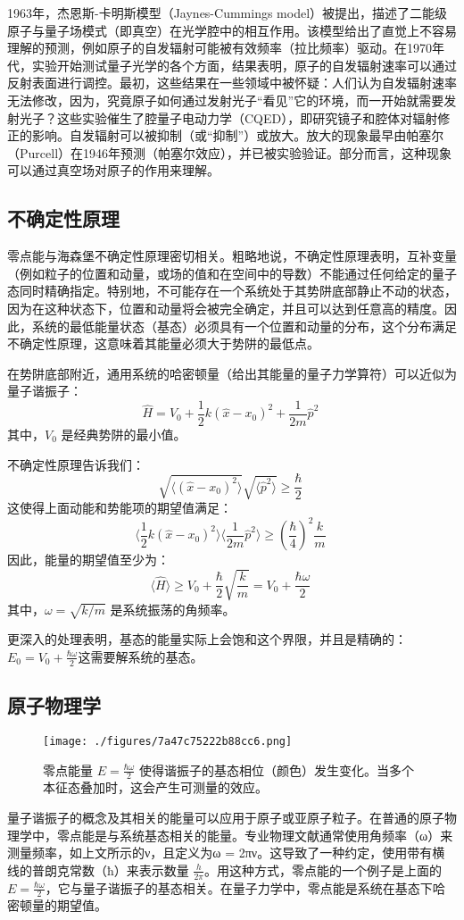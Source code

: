 1963年，杰恩斯-卡明斯模型（Jaynes-Cummings model）被提出，描述了二能级原子与量子场模式（即真空）在光学腔中的相互作用。该模型给出了直觉上不容易理解的预测，例如原子的自发辐射可能被有效频率（拉比频率）驱动。在1970年代，实验开始测试量子光学的各个方面，结果表明，原子的自发辐射速率可以通过反射表面进行调控。最初，这些结果在一些领域中被怀疑：人们认为自发辐射速率无法修改，因为，究竟原子如何通过发射光子“看见”它的环境，而一开始就需要发射光子？这些实验催生了腔量子电动力学（CQED），即研究镜子和腔体对辐射修正的影响。自发辐射可以被抑制（或“抑制”）或放大。放大的现象最早由帕塞尔（Purcell）在1946年预测（帕塞尔效应），并已被实验验证。部分而言，这种现象可以通过真空场对原子的作用来理解。
\subsection{不确定性原理}
零点能与海森堡不确定性原理密切相关。粗略地说，不确定性原理表明，互补变量（例如粒子的位置和动量，或场的值和在空间中的导数）不能通过任何给定的量子态同时精确指定。特别地，不可能存在一个系统处于其势阱底部静止不动的状态，因为在这种状态下，位置和动量将会被完全确定，并且可以达到任意高的精度。因此，系统的最低能量状态（基态）必须具有一个位置和动量的分布，这个分布满足不确定性原理，这意味着其能量必须大于势阱的最低点。

在势阱底部附近，通用系统的哈密顿量（给出其能量的量子力学算符）可以近似为量子谐振子：
\[
{\hat {H}} = V_0 + \frac{1}{2}k\left({\hat {x}} - x_0\right)^2 + \frac{1}{2m}{\hat {p}}^2~
\]
其中，\(V_0\) 是经典势阱的最小值。

不确定性原理告诉我们：
\[
\sqrt{\langle \left({\hat {x}} - x_0\right)^2 \rangle} \sqrt{\langle {\hat {p}}^2 \rangle} \geq \frac{\hbar}{2}~
\]
这使得上面动能和势能项的期望值满足：
\[
\langle \frac{1}{2}k\left({\hat {x}} - x_0\right)^2 \rangle \langle \frac{1}{2m}{\hat {p}}^2 \rangle \geq \left( \frac{\hbar}{4} \right)^2 \frac{k}{m}~
\]
因此，能量的期望值至少为：
\[
\langle {\hat {H}} \rangle \geq V_0 + \frac{\hbar}{2} \sqrt{\frac{k}{m}} = V_0 + \frac{\hbar \omega}{2}~
\]
其中，\(\omega = \sqrt{k/m}\) 是系统振荡的角频率。

更深入的处理表明，基态的能量实际上会饱和这个界限，并且是精确的：\(E_0 = V_0 + \frac{\hbar \omega}{2}\)这需要解系统的基态。
\subsection{原子物理学}
\begin{figure}[ht]
\centering
\texttt{[image: ./figures/7a47c75222b88cc6.png]}
\caption{零点能量 \( E = \frac{\hbar \omega}{2} \) 使得谐振子的基态相位（颜色）发生变化。当多个本征态叠加时，这会产生可测量的效应。} \label{fig_LD_10}
\end{figure}
量子谐振子的概念及其相关的能量可以应用于原子或亚原子粒子。在普通的原子物理学中，零点能是与系统基态相关的能量。专业物理文献通常使用角频率（ω）来测量频率，如上文所示的ν，且定义为ω = 2πν。这导致了一种约定，使用带有横线的普朗克常数（ħ）来表示数量 \( \frac{h}{2\pi} \)。用这种方式，零点能的一个例子是上面的 \( E = \frac{\hbar \omega}{2} \)，它与量子谐振子的基态相关。在量子力学中，零点能是系统在基态下哈密顿量的期望值。

